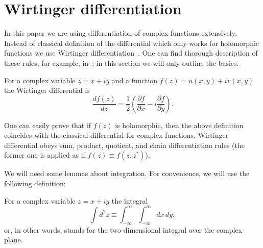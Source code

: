 \section{Wirtinger differentiation}

In this paper we are using differentiation of complex functions extensively.
Instead of classical definition of the differential which only works for holomorphic functions
we use Wirtinger differentiation~\cite{Wirtinger1927}.
One can find thorough description of these rules, for example, in~\cite{Kreutz-Delgado2009};
in this section we will only outline the basics.

\begin{definition}
	For a complex variable $z = x + iy$ and a function $f(z) = u(x, y) + iv(x, y)$ the Wirtinger differential is
	\begin{equation*}
		\frac{df(z)}{dz}
		= \frac{1}{2} \left(
			\frac{\partial f}{\partial x} - i \frac{\partial f}{\partial y}
		\right).
	\end{equation*}
\end{definition}

One can easily prove that if $f(z)$ is holomorphic, then the above definition coincides with the classical differential for complex functions.
Wirtinger differential obeys sum, product, quotient, and chain differentiation rules
(the former one is applied as if $f(z) \equiv f(z, z^*)$).

We will need some lemmas about integration.
For convenience, we will use the following definition:
\begin{definition}
	For a complex variable $z = x + iy$ the integral
	\begin{equation*}
		\int d^2 z \equiv \int_{-\infty}^{\infty} \int_{-\infty}^{\infty} dx\, dy,
	\end{equation*}
	or, in other words, stands for the two-dimensional integral over the complex plane.
\end{definition}

